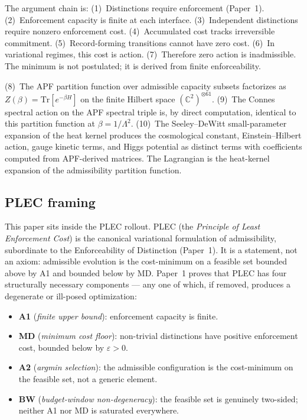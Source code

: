 \documentclass[11pt]{article}
\theoremstyle{definition}
\begin{document}
The argument chain is: (1)~Distinctions require enforcement (Paper~1).  (2)~Enforcement capacity is finite at each interface.  (3)~Independent distinctions require nonzero enforcement cost.  (4)~Accumulated cost tracks irreversible commitment.  (5)~Record-forming transitions cannot have zero cost.  (6)~In variational regimes, this cost is action.  (7)~Therefore zero action is inadmissible.  The minimum is not postulated; it is derived from finite enforceability.

(8)~The APF partition function over admissible capacity subsets factorizes as $Z(\beta) = \mathrm{Tr}[e^{-\beta H}]$ on the finite Hilbert space $(\mathbb{C}^2)^{\otimes 61}$.  (9)~The Connes spectral action on the APF spectral triple is, by direct computation, identical to this partition function at $\beta = 1/\Lambda^2$.  (10)~The Seeley--DeWitt small-parameter expansion of the heat kernel produces the cosmological constant, Einstein--Hilbert action, gauge kinetic terms, and Higgs potential as distinct terms with coefficients computed from APF-derived matrices.  The Lagrangian is the heat-kernel expansion of the admissibility partition function.

\subsection{PLEC framing}
This paper sits inside the PLEC rollout.  PLEC (the \emph{Principle of Least Enforcement Cost}) is the canonical variational formulation of admissibility, subordinate to the Enforceability of Distinction (Paper~1).  It is a statement, not an axiom: admissible evolution is the cost-minimum on a feasible set bounded above by A1 and bounded below by MD.  Paper~1 proves that PLEC has four structurally necessary components --- any one of which, if removed, produces a degenerate or ill-posed optimization:
\begin{itemize}
\item \textbf{A1} (\emph{finite upper bound}): enforcement capacity is finite.
\item \textbf{MD} (\emph{minimum cost floor}): non-trivial distinctions have positive enforcement cost, bounded below by $\varepsilon > 0$.
\item \textbf{A2} (\emph{argmin selection}): the admissible configuration is the cost-minimum on the feasible set, not a generic element.
\item \textbf{BW} (\emph{budget-window non-degeneracy}): the feasible set is genuinely two-sided; neither A1 nor MD is saturated everywhere.
\end{itemize}
\end{document}
